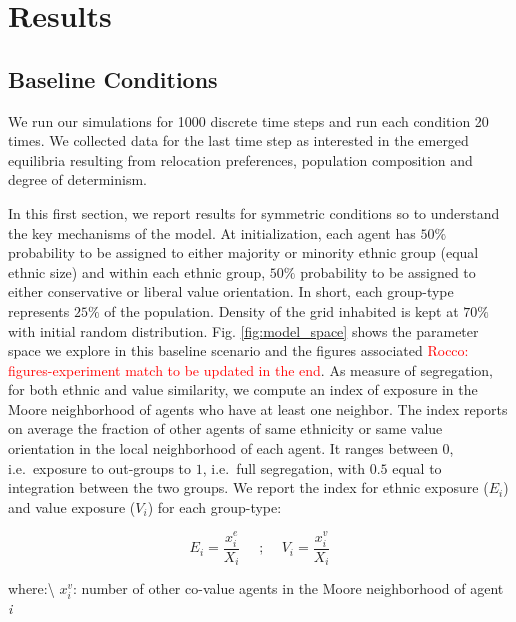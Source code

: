 \documentclass[
]{article}
\begin{document}
\hypertarget{results}{%
\section{Results}\label{results}}

\hypertarget{baseline-conditions}{%
\subsection{Baseline Conditions}\label{baseline-conditions}}

We run our simulations for 1000 discrete time steps and run each
condition 20 times. We collected data for the last time step as
interested in the emerged equilibria resulting from relocation
preferences, population composition and degree of determinism.

In this first section, we report results for symmetric conditions so to
understand the key mechanisms of the model. At initialization, each
agent has \(50\%\) probability to be assigned to either majority or
minority ethnic group (equal ethnic size) and within each ethnic group,
\(50\%\) probability to be assigned to either conservative or liberal
value orientation. In short, each group-type represents \(25\%\) of the
population. Density of the grid inhabited is kept at \(70\%\) with
initial random distribution. Fig. \ref{fig:model_space} shows the
parameter space we explore in this baseline scenario and the figures
associated
{\textcolor{red}{Rocco: figures-experiment match to be updated in the end}}.
As measure of segregation, for both ethnic and value similarity, we
compute an index of exposure in the Moore neighborhood of agents who
have at least one neighbor. The index reports on average the fraction of
other agents of same ethnicity or same value orientation in the local
neighborhood of each agent. It ranges between \(0\), i.e.~exposure to
out-groups to \(1\), i.e.~full segregation, with \(0.5\) equal to
integration between the two groups. We report the index for ethnic
exposure (\(E_i\)) and value exposure (\(V_i\)) for each group-type:

\begin{equation}
   E_i = \frac{x^e_i}{X_i}\quad\text{   ;    }\quad  V_i = \frac{x^v_i}{X_i}
\end{equation}

where:\textbackslash{} \(x^v_i\): number of other co-value agents in the
Moore neighborhood of agent \textit{i}

\par
\end{document}
